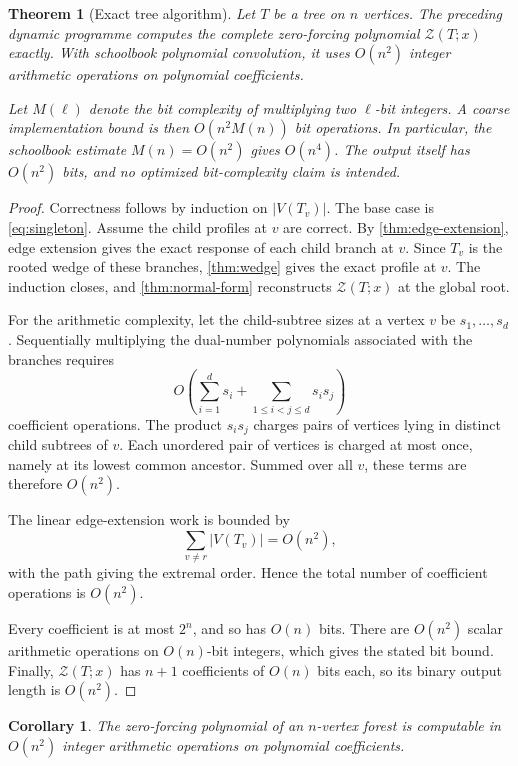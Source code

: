 \documentclass[11pt,reqno]{amsart}
\newtheorem{theorem}{Theorem}[section]
\newtheorem{corollary}[corollary]{Corollary}
\theoremstyle{definition}
\newcommand{\Zpoly}{\mathcal Z}
\begin{document}
\begin{theorem}[Exact tree algorithm]\label{thm:tree-algorithm}
Let $T$ be a tree on $n$ vertices.  The preceding dynamic programme computes the complete zero-forcing polynomial $\Zpoly(T;x)$ exactly.  With schoolbook polynomial convolution, it uses $O(n^2)$ integer arithmetic operations on polynomial coefficients.

Let $M(\ell)$ denote the bit complexity of multiplying two $\ell$-bit integers.  A coarse implementation bound is then $O(n^2M(n))$ bit operations.  In particular, the schoolbook estimate $M(n)=O(n^2)$ gives $O(n^4)$.  The output itself has $O(n^2)$ bits, and no optimized bit-complexity claim is intended.
\end{theorem}

\begin{proof}
Correctness follows by induction on $|V(T_v)|$.  The base case is \eqref{eq:singleton}.  Assume the child profiles at $v$ are correct.  By \cref{thm:edge-extension}, edge extension gives the exact response of each child branch at $v$.  Since $T_v$ is the rooted wedge of these branches, \cref{thm:wedge} gives the exact profile at $v$.  The induction closes, and \cref{thm:normal-form} reconstructs $\Zpoly(T;x)$ at the global root.

For the arithmetic complexity, let the child-subtree sizes at a vertex $v$ be $s_1,\dots,s_d$.  Sequentially multiplying the dual-number polynomials associated with the branches requires
\[
  O\!\left(\sum_{i=1}^d s_i+\sum_{1\le i<j\le d}s_is_j\right)
\]
coefficient operations.  The product $s_is_j$ charges pairs of vertices lying in distinct child subtrees of $v$.  Each unordered pair of vertices is charged at most once, namely at its lowest common ancestor.  Summed over all $v$, these terms are therefore $O(n^2)$.

The linear edge-extension work is bounded by
\[
  \sum_{v\ne r}|V(T_v)|=O(n^2),
\]
with the path giving the extremal order.  Hence the total number of coefficient operations is $O(n^2)$.

Every coefficient is at most $2^n$, and so has $O(n)$ bits.  There are $O(n^2)$ scalar arithmetic operations on $O(n)$-bit integers, which gives the stated bit bound.  Finally, $\Zpoly(T;x)$ has $n+1$ coefficients of $O(n)$ bits each, so its binary output length is $O(n^2)$.
\end{proof}

\begin{corollary}\label{cor:forest}
The zero-forcing polynomial of an $n$-vertex forest is computable in $O(n^2)$ integer arithmetic operations on polynomial coefficients.
\end{corollary}
\end{document}
